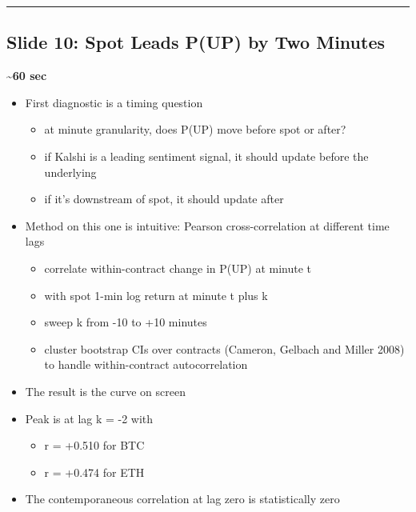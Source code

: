 \documentclass[
]{article}
\providecommand{\tightlist}{%
  \setlength{\itemsep}{0pt}\setlength{\parskip}{0pt}}
\begin{document}
\begin{center}\rule{0.5\linewidth}{0.5pt}\end{center}

\subsection{Slide 10: Spot Leads P(UP) by Two
Minutes}\label{slide-10-spot-leads-pup-by-two-minutes}

\textbf{\textasciitilde60 sec}

\begin{itemize}
\tightlist
\item
  First diagnostic is a timing question

  \begin{itemize}
  \tightlist
  \item
    at minute granularity, does P(UP) move before spot or after?
  \item
    if Kalshi is a leading sentiment signal, it should update before the
    underlying
  \item
    if it's downstream of spot, it should update after
  \end{itemize}
\item
  Method on this one is intuitive: Pearson cross-correlation at
  different time lags

  \begin{itemize}
  \tightlist
  \item
    correlate within-contract change in P(UP) at minute t
  \item
    with spot 1-min log return at minute t plus k
  \item
    sweep k from -10 to +10 minutes
  \item
    cluster bootstrap CIs over contracts (Cameron, Gelbach and Miller
    2008) to handle within-contract autocorrelation
  \end{itemize}
\item
  The result is the curve on screen
\item
  Peak is at lag k = -2 with

  \begin{itemize}
  \tightlist
  \item
    r = +0.510 for BTC
  \item
    r = +0.474 for ETH
  \end{itemize}
\item
  The contemporaneous correlation at lag zero is statistically zero


\end{itemize}
\end{document}
